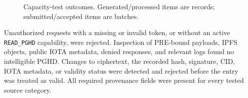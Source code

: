 \begin{figure}[t]
	\centering
	\caption{Capacity-test outcomes. Generated/processed items are records; submitted/accepted items are batches.}
	\label{fig:capacity-results}
\end{figure}

Unauthorized requests with a missing or invalid token, or without an active \texttt{READ\_PGHD} capability, were rejected.
Inspection of PRE-bound payloads, IPFS objects, public IOTA metadata, denied responses, and relevant logs found no intelligible PGHD.
Changes to ciphertext, the recorded hash, signature, CID, IOTA metadata, or validity status were detected and rejected before the entry was treated as valid.
All required provenance fields were present for every tested source category.

